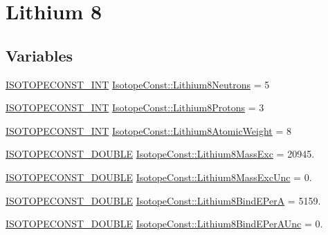 \hypertarget{group___isotope_const-_lithium-_li8}{}\section{Lithium 8}
\label{group___isotope_const-_lithium-_li8}
\subsection*{Variables}
\begin{DoxyCompactItemize}
\item 
\mbox{\hyperlink{group___isotope_const-_macros_ga5f18360b3e99483a35c32d789e62621c}{I\+S\+O\+T\+O\+P\+E\+C\+O\+N\+S\+T\+\_\+\+I\+NT}} \mbox{\hyperlink{group___isotope_const-_lithium-_li8_ga0ec95ca7ab95597f4ebeaf7b5bbfca6d}{Isotope\+Const\+::\+Lithium8\+Neutrons}} = 5
\item 
\mbox{\hyperlink{group___isotope_const-_macros_ga5f18360b3e99483a35c32d789e62621c}{I\+S\+O\+T\+O\+P\+E\+C\+O\+N\+S\+T\+\_\+\+I\+NT}} \mbox{\hyperlink{group___isotope_const-_lithium-_li8_ga07cc0aa750bac5785d24fce3bfd249a5}{Isotope\+Const\+::\+Lithium8\+Protons}} = 3
\item 
\mbox{\hyperlink{group___isotope_const-_macros_ga5f18360b3e99483a35c32d789e62621c}{I\+S\+O\+T\+O\+P\+E\+C\+O\+N\+S\+T\+\_\+\+I\+NT}} \mbox{\hyperlink{group___isotope_const-_lithium-_li8_gac6f8852666a61b9aef6645688cbf7ac3}{Isotope\+Const\+::\+Lithium8\+Atomic\+Weight}} = 8
\item 
\mbox{\hyperlink{group___isotope_const-_macros_ga8f45a7272ce02c0b4c65c44636ed719a}{I\+S\+O\+T\+O\+P\+E\+C\+O\+N\+S\+T\+\_\+\+D\+O\+U\+B\+LE}} \mbox{\hyperlink{group___isotope_const-_lithium-_li8_ga8ffbd3de4f8bdad35efb96b0cb7ea5e2}{Isotope\+Const\+::\+Lithium8\+Mass\+Exc}} = 20945.
\item 
\mbox{\hyperlink{group___isotope_const-_macros_ga8f45a7272ce02c0b4c65c44636ed719a}{I\+S\+O\+T\+O\+P\+E\+C\+O\+N\+S\+T\+\_\+\+D\+O\+U\+B\+LE}} \mbox{\hyperlink{group___isotope_const-_lithium-_li8_gad3ac8994a625ec7526de4b83bc2e1ea4}{Isotope\+Const\+::\+Lithium8\+Mass\+Exc\+Unc}} = 0.
\item 
\mbox{\hyperlink{group___isotope_const-_macros_ga8f45a7272ce02c0b4c65c44636ed719a}{I\+S\+O\+T\+O\+P\+E\+C\+O\+N\+S\+T\+\_\+\+D\+O\+U\+B\+LE}} \mbox{\hyperlink{group___isotope_const-_lithium-_li8_ga1e28fb13a74dd9f05737b7154ce859e9}{Isotope\+Const\+::\+Lithium8\+Bind\+E\+PerA}} = 5159.
\item 
\mbox{\hyperlink{group___isotope_const-_macros_ga8f45a7272ce02c0b4c65c44636ed719a}{I\+S\+O\+T\+O\+P\+E\+C\+O\+N\+S\+T\+\_\+\+D\+O\+U\+B\+LE}} \mbox{\hyperlink{group___isotope_const-_lithium-_li8_gad44daad42a319fb49a405c077278fc16}{Isotope\+Const\+::\+Lithium8\+Bind\+E\+Per\+A\+Unc}} = 0.

\end{DoxyCompactItemize}
